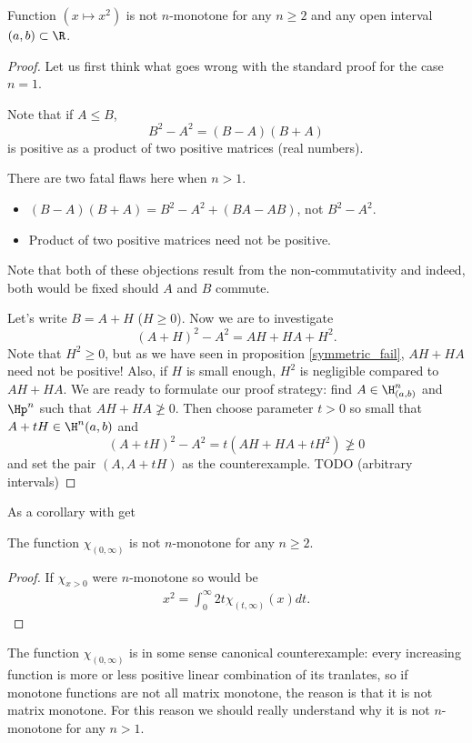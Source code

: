 \begin{prop}
	Function $(x \mapsto x^2)$ is not $n$-monotone for any $n \geq 2$ and any open interval $(a, b) \subset \R$.
\end{prop}
\begin{proof}
	Let us first think what goes wrong with the standard proof for the case $n = 1$.

	Note that if $A \leq B$,
	\[
		B^2 - A^2 = (B - A) (B + A)
	\]
	is positive as a product of two positive matrices (real numbers).

	There are two fatal flaws here when $n > 1$.
	\begin{itemize}
		\item $(B - A) (B + A) = B^2-A^2 + (B A - A B)$, not $B^2 - A^2$.
		\item Product of two positive matrices need not be positive.
	\end{itemize}
	Note that both of these objections result from the non-commutativity and indeed, both would be fixed should $A$ and $B$ commute.

	Let's write $B = A + H$ ($H \geq 0$). Now we are to investigate
	\[
		(A + H)^2-A^2 = A H + H A + H^2.
	\]
	Note that $H^2 \geq 0$, but as we have seen in proposition \ref{symmetric_fail}, $A H + H A$ need not be positive! Also, if $H$ is small enough, $H^2$ is negligible compared to $AH + HA$. We are ready to formulate our proof strategy: find $A \in \H^{n}_{(a, b)}$ and $\Hp^{n}$ such that $A H + H A \ngeq 0$. Then choose parameter $t > 0$ so small that $A + t H \in \H^{n}(a,b)$ and
	\[
		(A + t H)^2 - A^2 = t (A H + H A + t H^2) \ngeq 0
	\]
	and set the pair $(A, A + t H)$ as the counterexample.
	TODO (arbitrary intervals)
\end{proof}

As a corollary with get

\begin{kor}\label{chimon}
	The function $\chi_{(0, \infty)}$ is not $n$-monotone for any $n \geq 2$.
\end{kor}

\begin{proof}
	If $\chi_{x > 0}$ were $n$-monotone so would be
	\begin{align*}
		x^2 = \int_{0}^{\infty} 2 t \chi_{(t, \infty)}(x) dt.
	\end{align*}
\end{proof}

The function $\chi_{(0, \infty)}$ is in some sense canonical counterexample: every increasing function is more or less positive linear combination of its tranlates, so if monotone functions are not all matrix monotone, the reason is that it is not matrix monotone. For this reason we should really understand why it is not $n$-monotone for any $n > 1$.

